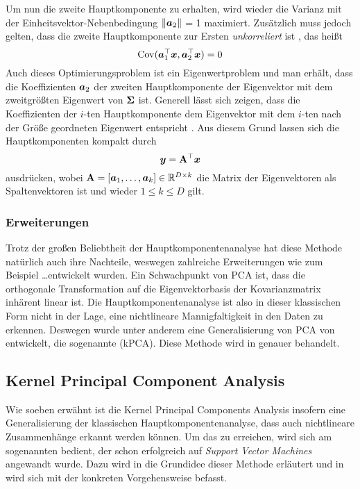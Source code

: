 Um nun die zweite Hauptkomponente zu erhalten, wird wieder die Varianz mit der
Einheitsvektor-Nebenbedingung $\lVert\bm{a}_2\rVert$ = 1 maximiert. Zusätzlich muss jedoch gelten,
dass die zweite Hauptkomponente zur Ersten \textit{unkorreliert} ist \parencite[5]{Jolliffe.2002}, das heißt
\begin{equation}
	\operatorname{Cov}(\bm{a}_1^\top\bm{x}, \bm{a}_2^\top\bm{x}) = 0
\end{equation}
Auch dieses Optimierungsproblem ist ein Eigenwertproblem und man erhält, dass die Koeffizienten $\bm{a}_2$ der zweiten Hauptkomponente der Eigenvektor mit dem zweitgrößten Eigenwert von $\mathbf{\Sigma}$ ist.
Generell lässt sich zeigen, dass die Koeffizienten der $i$-ten Hauptkomponente dem Eigenvektor mit dem $i$-ten nach der Größe geordneten Eigenwert entspricht \parencite[6]{Jolliffe.2002}. Aus diesem Grund lassen sich die Hauptkomponenten kompakt durch
\begin{equation}
	\bm{y} = \mathbf{A}^\top \bm{x}
\end{equation}
ausdrücken, wobei $\mathbf{A} = [\bm{a}_1,\ldots,\bm{a}_k] \in \mathbb{R}^{D \times k}$ die Matrix der Eigenvektoren als Spaltenvektoren ist und wieder $1 \leq k \leq D$ gilt.

\subsubsection{Erweiterungen}
\label{ch:MethodenDerDimRed:statistisch:PCA:Erweiterungen}
Trotz der großen Beliebtheit der Hauptkomponentenanalyse hat diese Methode natürlich auch ihre Nachteile, weswegen zahlreiche Erweiterungen wie zum Beispiel \ldots\addref entwickelt wurden.
Ein Schwachpunkt von PCA ist, dass die orthogonale Transformation auf die Eigenvektorbasis der Kovarianzmatrix inhärent linear ist. Die Hauptkomponentenanalyse ist also in dieser klassischen Form nicht in der Lage, eine nichtlineare Mannigfaltigkeit in den Daten zu erkennen. Deswegen wurde unter anderem eine Generalisierung von PCA von \textcite{Scholkopf.1997} entwickelt, die sogenannte  (kPCA). Diese Methode wird in  genauer behandelt.

\subsection{Kernel Principal Component Analysis}
\label{ch:MethodenDerDimRed:statistisch:kPCA}
Wie soeben erwähnt ist die Kernel Principal Components Analysis insofern eine Generalisierung der klassischen Hauptkomponentenanalyse, dass auch nichtlineare Zusammenhänge erkannt werden können.
Um das zu erreichen, wird sich am sogenannten  bedient, der schon erfolgreich auf \textit{Support Vector Machines} \parencite{Boser.1992} angewandt wurde. Dazu wird in
 die Grundidee dieser Methode erläutert
und in  wird sich mit der konkreten
Vorgehensweise befasst.

